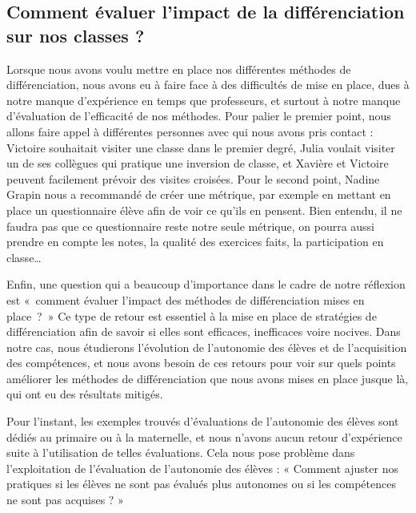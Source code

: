 
\subsection{Comment évaluer l'impact de la différenciation sur nos classes ?}


Lorsque nous avons voulu mettre en place nos différentes méthodes de différenciation, nous avons eu à faire face à des difficultés de mise en place, dues à notre manque d’expérience en temps que professeurs, et surtout à notre manque d’évaluation de l’efficacité de nos méthodes. Pour palier le premier point, nous allons faire appel à différentes personnes avec qui nous avons pris contact : Victoire souhaitait visiter une classe dans le premier degré, Julia voulait visiter un de ses collègues qui pratique une inversion de classe, et Xavière et Victoire peuvent facilement prévoir des visites croisées. Pour le second point, Nadine Grapin nous a recommandé de créer une métrique, par exemple en mettant en place un questionnaire élève afin de voir ce qu’ils en pensent. Bien entendu, il ne faudra pas que ce questionnaire reste notre seule métrique, on pourra aussi prendre en compte les notes, la qualité des exercices faits, la participation en classe…

Enfin, une question qui a beaucoup d’importance dans le cadre de notre réflexion est « comment évaluer l’impact des méthodes de différenciation mises en place ? » Ce type de retour est essentiel à la mise en place de stratégies de différenciation afin de savoir si elles sont efficaces, inefficaces voire nocives. Dans notre cas, nous étudierons l’évolution de l’autonomie des élèves et de l’acquisition des compétences, et nous avons besoin de ces retours pour voir sur quels points améliorer les méthodes de différenciation que nous avons mises en place jusque là, qui ont eu des résultats mitigés.

Pour l’instant, les exemples trouvés d’évaluations de l’autonomie des élèves sont dédiés au primaire ou à la maternelle, et nous n’avons aucun retour d’expérience suite à l’utilisation de telles évaluations. Cela nous pose problème dans l’exploitation de l’évaluation de l’autonomie des élèves : « Comment ajuster nos pratiques si les élèves ne sont pas évalués plus autonomes ou si les compétences ne sont pas acquises ? »

